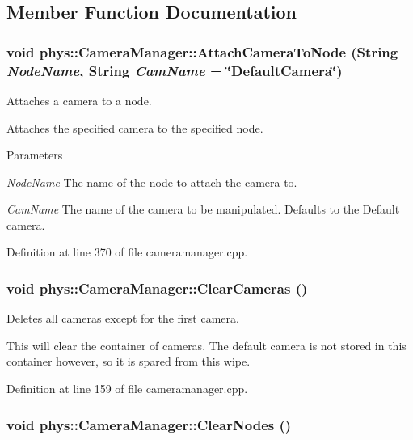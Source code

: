 \subsection{Member Function Documentation}
\hypertarget{classphys_1_1CameraManager_a1cde365b6cab80a33ddf7046489f7af9}{
\subsubsection[{AttachCameraToNode}]{\setlength{\rightskip}{0pt plus 5cm}void phys::CameraManager::AttachCameraToNode ({\bf String} {\em NodeName}, \/  {\bf String} {\em CamName} = {\ttfamily \char`\"{}DefaultCamera\char`\"{}})}}
\label{d9/d91/classphys_1_1CameraManager_a1cde365b6cab80a33ddf7046489f7af9}


Attaches a camera to a node. 

Attaches the specified camera to the specified node. 
\begin{DoxyParams}{Parameters}
\item[{\em NodeName}]The name of the node to attach the camera to. \item[{\em CamName}]The name of the camera to be manipulated. Defaults to the Default camera. \end{DoxyParams}


Definition at line 370 of file cameramanager.cpp.

\hypertarget{classphys_1_1CameraManager_a76bebee0820fcfa462412cb112b1b874}{
\subsubsection[{ClearCameras}]{\setlength{\rightskip}{0pt plus 5cm}void phys::CameraManager::ClearCameras ()}}
\label{d9/d91/classphys_1_1CameraManager_a76bebee0820fcfa462412cb112b1b874}


Deletes all cameras except for the first camera. 

This will clear the container of cameras. The default camera is not stored in this container however, so it is spared from this wipe. 

Definition at line 159 of file cameramanager.cpp.

\hypertarget{classphys_1_1CameraManager_a42d91612bbaa00187944290d6bfd44e9}{
\subsubsection[{ClearNodes}]{\setlength{\rightskip}{0pt plus 5cm}void phys::CameraManager::ClearNodes ()}}
\label{d9/d91/classphys_1_1CameraManager_a42d91612bbaa00187944290d6bfd44e9}


